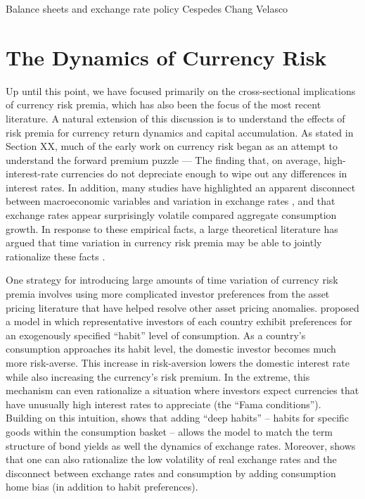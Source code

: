 \documentclass{ar-1col}
\begin{document}
Balance sheets and exchange rate policy Cespedes Chang Velasco 


\section{The Dynamics of Currency Risk\label{sec_dynamics}}

Up until this point, we have focused primarily on the cross-sectional implications of currency risk premia, which has also been the focus of the most recent literature. A natural extension of this discussion is to understand the effects of risk premia for currency return dynamics and capital accumulation. As stated in Section XX, much of the early work on currency risk began as an attempt to understand the forward premium puzzle --- The finding that, on average, high-interest-rate currencies do not depreciate enough to wipe out any differences in interest rates. In addition, many studies have highlighted an apparent disconnect between macroeconomic variables and variation in exchange rates \citep{MeeseRogoff1983,BackusSmith1993}, and that exchange rates appear surprisingly volatile compared aggregate consumption growth. In response to these empirical facts, a large theoretical literature has argued that time variation in currency risk premia may be able to jointly rationalize these facts \citep{Fama1984,Backusetal2001}.

One strategy for introducing large amounts of time variation of currency risk premia involves using more complicated investor preferences from the asset pricing literature that have helped resolve other asset pricing anomalies. \citet{Verdelhan2010} proposed a model in which representative investors of each country exhibit preferences for an exogenously specified ``habit'' level of consumption. As a country's consumption approaches its habit level, the domestic investor becomes much more risk-averse. This increase in risk-aversion lowers the domestic interest rate while also increasing the currency's risk premium. In the extreme, this mechanism can even rationalize a situation where investors expect currencies that have unusually high interest rates to appreciate (the ``Fama conditions'').  Building on this intuition, \citet{Heyerdahl-Larsen2011} shows that adding ``deep habits'' -- habits for specific goods within the consumption basket -- allows the model to match the term structure of bond yields as well the dynamics of exchange rates. Moreover, \citet{Stathopoulos2017} shows that one can also rationalize the low volatility of real exchange rates and the disconnect between exchange rates and consumption by adding consumption home bias (in addition to habit preferences). 
\end{document}
